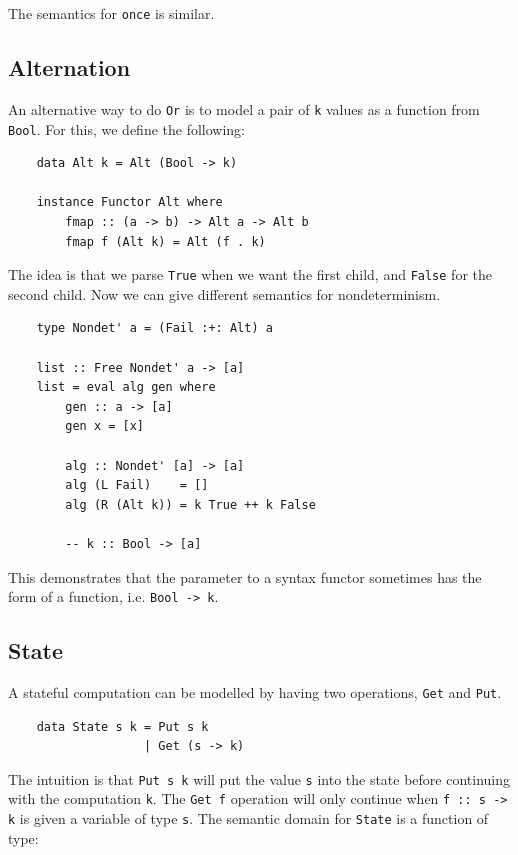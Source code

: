 \documentclass[a4paper,12pt]{article}
\theoremstyle{remark}
\begin{document}
The semantics for \lstinline{once} is similar.

\subsection{Alternation}

An alternative way to do \lstinline{Or} is to model a pair of \lstinline{k} values
as a function from \lstinline{Bool}. For this, we define the following:

\begin{lstlisting}
    data Alt k = Alt (Bool -> k)

    instance Functor Alt where
        fmap :: (a -> b) -> Alt a -> Alt b
        fmap f (Alt k) = Alt (f . k)  \end{lstlisting}

The idea is that we parse \lstinline{True} when we want the first child, and \lstinline{False}
for the second child. Now we can give different semantics for nondeterminism.

\begin{lstlisting}
    type Nondet' a = (Fail :+: Alt) a

    list :: Free Nondet' a -> [a]
    list = eval alg gen where
        gen :: a -> [a]
        gen x = [x]

        alg :: Nondet' [a] -> [a]
        alg (L Fail)    = []
        alg (R (Alt k)) = k True ++ k False

        -- k :: Bool -> [a]  \end{lstlisting}

This demonstrates that the parameter to a syntax functor sometimes has the form of a
function, i.e. \lstinline{Bool -> k}.

\subsection{State}

A stateful computation can be modelled by having two operations, \lstinline{Get}
and \lstinline{Put}.

\begin{lstlisting}
    data State s k = Put s k
                   | Get (s -> k)  \end{lstlisting}

The intuition is that \lstinline{Put s k} will put the value \lstinline{s} into the
state before continuing with the computation \lstinline{k}. The \lstinline{Get f}
operation will only continue when \lstinline{f :: s -> k} is given a variable of type
\lstinline{s}. The semantic domain for \lstinline{State} is a function of type:
\end{document}

